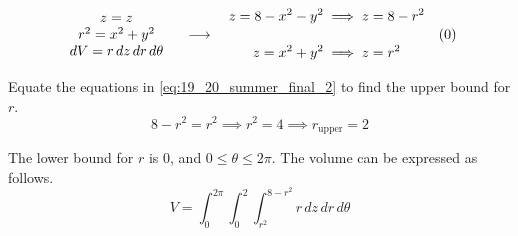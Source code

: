 \documentclass[a4paper, 12pt]{article}
\begin{document}
\begin{enumerate}[leftmargin=*,label=\textbf{\arabic*.}]
\begin{enumerate}[leftmargin=*,label=\textbf{\alph*.}]
\[
\begin{array}{c}
z=z\\
r^2=x^2+y^2\\
dV=r\,dz\,dr\,d\theta
\end{array}
\quad\longrightarrow\quad
\begin{aligned}
z=8-x^2-y^2
&\implies z=8-r^2\\[1em]
z=x^2+y^2
&\implies z=r^2
\end{aligned}
\quad
\vcenter{\hbox{(\theequation)}}
\]

Equate the equations in \eqref{eq:19_20_summer_final_2} to find the upper bound for $r$.
\[8-r^2=r^2\implies r^2=4\implies r_{\text{upper}}=2\]

The lower bound for $r$ is 0, and $0\leq\theta\leq2\pi$. The volume can be expressed as follows.
\[\boxed{V=\int_0^{2\pi}\int_0^2\int_{r^2}^{8-r^2}r\,dz\,dr\,d\theta}\]

\end{enumerate}
\end{enumerate}
\end{document}
